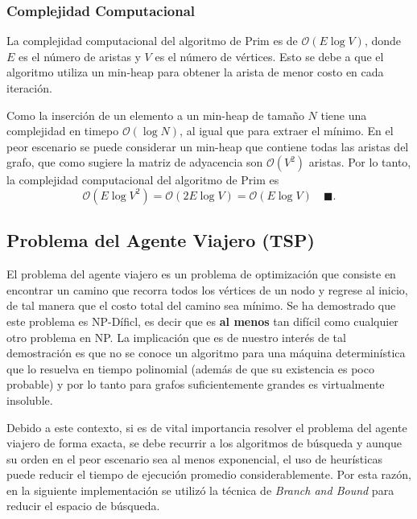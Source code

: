 \documentclass[12pt]{article}
\begin{document}
  \subsubsection{Complejidad Computacional}
  La complejidad computacional del algoritmo de Prim es de $\mathcal{O}(E\log V)$, donde $E$ es el número de aristas
  y $V$ es el número de vértices. Esto se debe a que el algoritmo utiliza un min-heap para obtener la arista
  de menor costo en cada iteración. 
  
  Como la inserción de un elemento a un min-heap de tamaño $N$ tiene una complejidad en timepo $\mathcal{O}(\log N)$, al igual que para extraer el mínimo. 
  En el peor escenario se puede considerar un min-heap que contiene todas las aristas del grafo, que como sugiere la matriz de adyacencia
  son $\mathcal{O}(V^2)$ aristas. Por lo tanto, la complejidad computacional del algoritmo de Prim es 
  \begin{equation}
    \mathcal{O}(E\log V^{2}) = \mathcal{O}(2E\log V) = \mathcal{O}(E\log V) \quad \blacksquare.
  \end{equation}

  \subsection{Problema del Agente Viajero (TSP)}

  El problema del agente viajero es un problema de optimización que consiste en encontrar un camino que recorra todos los vértices de un nodo y regrese al inicio,
  de tal manera que el costo total del camino sea mínimo. Se ha demostrado que este problema es NP-Díficl, es decir que es \textbf{al menos} tan difícil como cualquier otro problema en NP.
  La implicación que es de nuestro interés de tal demostración es que no se conoce un algoritmo para una máquina determinística que lo resuelva en tiempo polinomial (además de que su existencia 
  es poco probable) y por lo tanto para grafos suficientemente grandes es virtualmente insoluble.

  Debido a este contexto, si es de vital importancia resolver el problema del agente viajero de forma exacta, se debe recurrir a los algoritmos de búsqueda y aunque su orden en el peor escenario 
  sea al menos exponencial, el uso de heurísticas puede reducir el tiempo de ejecución promedio considerablemente. Por esta razón, en la siguiente implementación se utilizó la técnica de
  \textit{Branch and Bound} para reducir el espacio de búsqueda.
\end{document}

